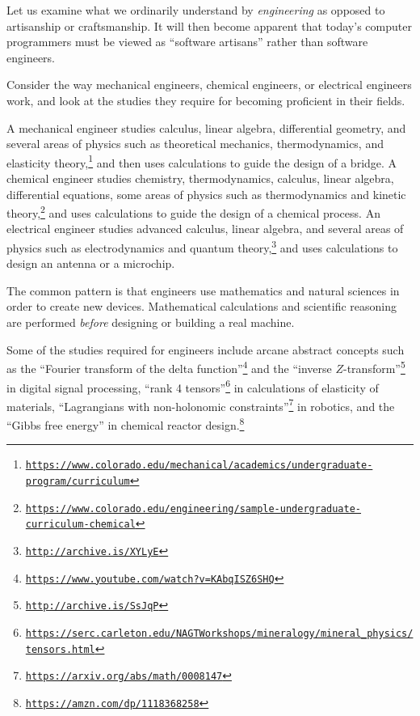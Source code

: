 

Let us examine what we ordinarily understand by \emph{engineering}
as opposed to artisanship or craftsmanship. It will then become apparent
that today\textsf{'}s computer programmers must be viewed as \textsf{``}software artisans\textsf{''}
rather than software engineers.


Consider the way mechanical engineers, chemical engineers, or electrical
engineers work, and look at the studies they require for becoming
proficient in their fields.

A mechanical engineer studies calculus, linear algebra, differential
geometry, and several areas of physics such as theoretical mechanics,
thermodynamics, and elasticity theory,\footnote{\texttt{\href{https://www.colorado.edu/mechanical/academics/undergraduate-program/curriculum}{https://www.colorado.edu/mechanical/academics/undergraduate-program/curriculum}}}
and then uses calculations to guide the design of a bridge. A chemical
engineer studies chemistry, thermodynamics, calculus, linear algebra,
differential equations, some areas of physics such as thermodynamics
and kinetic theory,\footnote{\texttt{\href{https://www.colorado.edu/engineering/sample-undergraduate-curriculum-chemical}{https://www.colorado.edu/engineering/sample-undergraduate-curriculum-chemical}}}
and uses calculations to guide the design of a chemical process. An
electrical engineer studies advanced calculus, linear algebra, and
several areas of physics such as electrodynamics and quantum theory,\footnote{\texttt{\href{http://archive.is/XYLyE}{http://archive.is/XYLyE}}}
and uses calculations to design an antenna or a microchip.

The common pattern is that engineers use mathematics and natural sciences
in order to create new devices. Mathematical calculations and scientific
reasoning are performed \emph{before} designing or building a real
machine.

Some of the studies required for engineers include arcane abstract
concepts such as the \textsf{``}Fourier transform of the delta function\textsf{''}\footnote{\texttt{\href{https://www.youtube.com/watch?v=KAbqISZ6SHQ}{https://www.youtube.com/watch?v=KAbqISZ6SHQ}}}
and the \textsf{``}inverse $Z$-transform\textsf{''}\footnote{\texttt{\href{http://archive.is/SsJqP}{http://archive.is/SsJqP}}}
in digital signal processing, \textsf{``}rank 4 tensors\textsf{''}\footnote{\texttt{\href{https://serc.carleton.edu/NAGTWorkshops/mineralogy/mineral_physics/tensors.html}{https://serc.carleton.edu/NAGTWorkshops/mineralogy/mineral\_physics/tensors.html}}}
in calculations of elasticity of materials, \textsf{``}Lagrangians with non-holonomic
constraints\textsf{''}\footnote{\texttt{\href{https://arxiv.org/abs/math/0008147}{https://arxiv.org/abs/math/0008147}}}
in robotics, and the \textsf{``}Gibbs free energy\textsf{''} in chemical reactor design.\footnote{\texttt{\href{https://amzn.com/dp/1118368258}{https://amzn.com/dp/1118368258}}}

